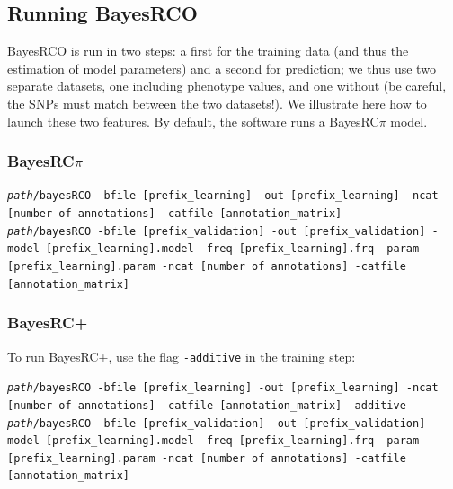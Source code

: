 \documentclass{ol-softwaremanual}
\begin{document}
\color{black}

\subsection{Running BayesRCO}

BayesRCO is run in two steps: a first for the training data (and thus the estimation of model parameters) and a second for prediction; we thus use two separate datasets, one including phenotype values, and one without (be careful, the SNPs must match between the two datasets!). We illustrate here how to launch these two features. By default, the software runs a BayesRC$\pi$ model.

\subsubsection{BayesRC$\pi$}

\begin{tcolorbox}

\texttt{\textit{path}/bayesRCO -bfile [prefix\_learning] -out [prefix\_learning] -ncat [number of annotations] -catfile [annotation\_matrix]} \\

\texttt{\textit{path}/bayesRCO -bfile [prefix\_validation] -out [prefix\_validation] -model [prefix\_learning].model -freq [prefix\_learning].frq -param [prefix\_learning].param -ncat [number of annotations] -catfile [annotation\_matrix] }
\end{tcolorbox}

\subsubsection{BayesRC+}

To run BayesRC+, use the flag \texttt{-additive} in the training step:

\begin{tcolorbox}

\texttt{\textit{path}/bayesRCO -bfile [prefix\_learning] -out [prefix\_learning] -ncat [number of annotations] -catfile [annotation\_matrix] -additive} \\

\texttt{\textit{path}/bayesRCO -bfile [prefix\_validation] -out [prefix\_validation] -model [prefix\_learning].model -freq [prefix\_learning].frq -param [prefix\_learning].param -ncat [number of annotations] -catfile [annotation\_matrix] }
\end{tcolorbox}
\end{document}
